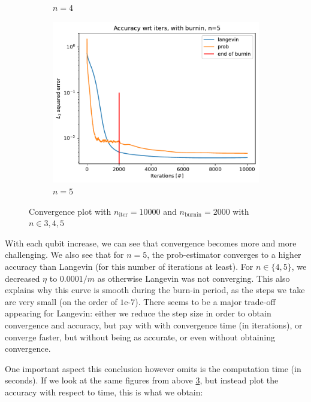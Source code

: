 \documentclass[12pt]{memoir}
\newcommand{\nitern}[1]{$n_{\text{iter}}=#1$}
\newcommand{\nburninn}[1]{$n_{\text{burnin}}=#1$}
\begin{document}
\begin{figure}[H]
\begin{subfigure}[b]{0.49\textwidth}
        \caption{$n=4$}
        \label{fig:conv-plot-diff-n-4-sub}
    \end{subfigure}
    \begin{subfigure}[b]{0.49\textwidth}
        \centering
        \includegraphics[width=\textwidth]{figures/experiments/baseline/diff_n_qubits/iters_acc_comp_iters_no_avg_n5-1.png}
        \caption{$n=5$}
        \label{fig:conv-plot-diff-n-5-sub}
    \end{subfigure}
    \caption{Convergence plot with \nitern{10000} and \nburninn{2000} with $n\in{3,4,5}$}
    \label{fig:conv-plot-diff-n}
\end{figure}

With each qubit increase, we can see that convergence becomes more and more challenging. We also see that for $n=5$, the prob-estimator converges to a higher accuracy than Langevin (for this number of iterations at least). For $n\in\{4,5\}$, we decreased $\eta$ to $0.0001/m$ as otherwise Langevin was not converging. This also explains why this curve is smooth during the burn-in period, as the steps we take are very small (on the order of $1\text{e-}7$). There seems to be a major trade-off appearing for Langevin: either we reduce the step size in order to obtain convergence and accuracy, but pay with with convergence time (in iterations), or converge faster, but without being as accurate, or even without obtaining convergence. \medbreak

One important aspect this conclusion however omits is the computation time (in seconds). If we look at the same figures from above \ref{fig:conv-plot-diff-n}, but instead plot the accuracy with respect to time, this is what we obtain:
\end{document}

